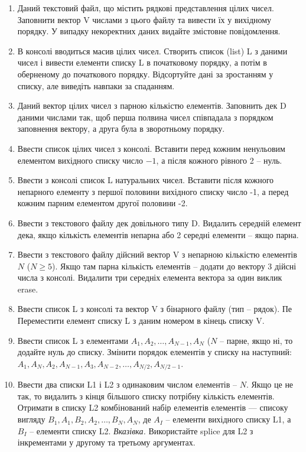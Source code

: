 \documentclass[]{article}
\begin{document}
\begin{enumerate}
\def\labelenumi{\arabic{enumi}.}
\item
  Даний текстовий файл, що містить рядкові представлення цілих чисел.
  Заповнити вектор V числами з цього файлу та вивести їх у вихідному
  порядку. У випадку некоректних даних видайте змістовне повідомлення.
\item
  В консолі вводиться масив цілих чисел. Створить список (list) L з даними чисел
 і вивести елементи списку L в початковому порядку, а
  потім в оберненому до початкового порядку. 
  Відсортуйте дані за зростанням у списку, але виведіть навпаки за спаданням.
\item
  Даний вектор цілих чисел з парною кількістю елементів. Заповнить дек D
  даними числами так, щоб перша полвина чисел співпадала з порядком
  заповнення вектору, а друга була в зворотньому порядку.
\item
  Ввести список цілих чисел з консолі. Вставити перед кожним ненульовим
  елементом вихідного списку число \(- 1\), а після кожного рівного 2 --
  нуль.
\item
  Ввести з консолі список L натуральних чисел. Вставити після кожного
  непарного елементу з першої половини вихідного списку число -1, а
  перед кожним парним елементом другої половини -2.
\item
  Ввести з текстового файлу дек довільного типу D. Видалить середній
  елемент дека, якщо кількість елементів непарна або 2 середні елементи
  -- якщо парна.
\item
  Ввести з текстового файлу дійсний вектор V з непарною кількістю
  елементів \(N\) (\(N \geq 5\)). Якщо там парна кількість елементів --
  додати до вектору 3 дійсні числа з консолі. Видалити три середніх
  елемента вектора за один виклик erase.
\item
  Ввести список L з консолі та вектор V з бінарного файлу (тип --
  рядок). Пе Переместити елемент списку L з даним номером в кінець
  списку V.
\item
  Ввести список L з елементами \(A_{1},A_{2},\ldots,A_{N - 1},A_{N}\)
  (\(N\) -- парне, якщо ні, то додайте нуль до списку. Змінити порядок
  елементів у списку на наступний:
  \(A_{1},A_{N},A_{2},A_{N - 1},A_{3},A_{N - 2},\ldots,A_{N/2},A_{N/2 - 1}\).
\item
  Ввести два списки L1 і L2 з одинаковим числом елементів -- \(N\). Якщо
  це не так, то видалить з кінця більшого списку потрібну кількість
  елементів. Отримати в списку L2 комбінований набір елементів елементів
  --- списоку вигляду \(B_{1},A_{1},B_{2},A_{2},\ldots,B_{N},A_{N}\), де
  \(A_{I}\) -- елементи вихідного списку L1, а \(B_{I}\) -- елементи
  списку L2. \emph{Вказівка.} Використайте splice для L2 з інкрементами
  у другому та третьому аргументах.
\end{enumerate}
\end{document}
